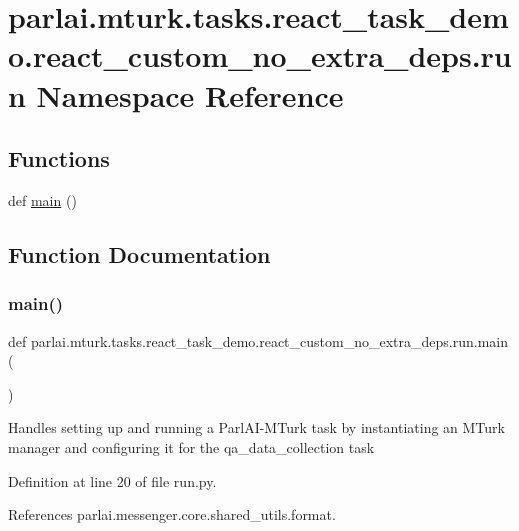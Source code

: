 \hypertarget{namespaceparlai_1_1mturk_1_1tasks_1_1react__task__demo_1_1react__custom__no__extra__deps_1_1run}{}\section{parlai.\+mturk.\+tasks.\+react\+\_\+task\+\_\+demo.\+react\+\_\+custom\+\_\+no\+\_\+extra\+\_\+deps.\+run Namespace Reference}
\label{namespaceparlai_1_1mturk_1_1tasks_1_1react__task__demo_1_1react__custom__no__extra__deps_1_1run}
\subsection*{Functions}
\begin{DoxyCompactItemize}
\item 
def \hyperlink{namespaceparlai_1_1mturk_1_1tasks_1_1react__task__demo_1_1react__custom__no__extra__deps_1_1run_a5ccd8dcc8c90287995d42dc7e0162a23}{main} ()
\end{DoxyCompactItemize}


\subsection{Function Documentation}
\mbox{\label{namespaceparlai_1_1mturk_1_1tasks_1_1react__task__demo_1_1react__custom__no__extra__deps_1_1run_a5ccd8dcc8c90287995d42dc7e0162a23}} 
\subsubsection{\texorpdfstring{main()}{main()}}
{\footnotesize\ttfamily def parlai.\+mturk.\+tasks.\+react\+\_\+task\+\_\+demo.\+react\+\_\+custom\+\_\+no\+\_\+extra\+\_\+deps.\+run.\+main (\begin{DoxyParamCaption}{ }\end{DoxyParamCaption})}

\begin{DoxyVerb}Handles setting up and running a ParlAI-MTurk task by instantiating
an MTurk manager and configuring it for the qa_data_collection task
\end{DoxyVerb}
 

Definition at line 20 of file run.\+py.



References parlai.\+messenger.\+core.\+shared\+\_\+utils.\+format.

